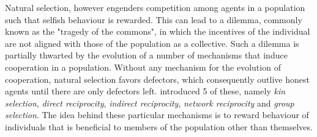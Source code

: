\documentclass[11pt,a4paper]{article}
\theoremstyle{definition}
\theoremstyle{theorem}
\theoremstyle{proposition}
\theoremstyle{corollary}
\theoremstyle{lemma}
\theoremstyle{example}
\theoremstyle{remark}
\begin{document}
\noindent{}Natural selection, however engenders competition among agents in a population such that selfish behaviour is rewarded. This can lead to a dilemma, commonly known as the "tragedy of the commons", in which the incentives of the individual are not aligned with those of the population as a collective. Such a dilemma is partially thwarted by the evolution of a number of mechanisms that induce cooperation in a population. Without any mechanism for the evolution of cooperation, natural selection favors defectors, which consequently outlive honest agents until there are only defectors left. \cite{5 Rules for the Evolution of Cooperation} introduced 5 of these, namely {\it kin selection}, {\it direct reciprocity}, {\it indirect reciprocity}, {\it network reciprocity} and {\it group selection}. The idea behind these particular mechanisms is to reward behaviour of individuals that is beneficial to members of the population other than themselves. \vspace{1em}\\
\end{document}
